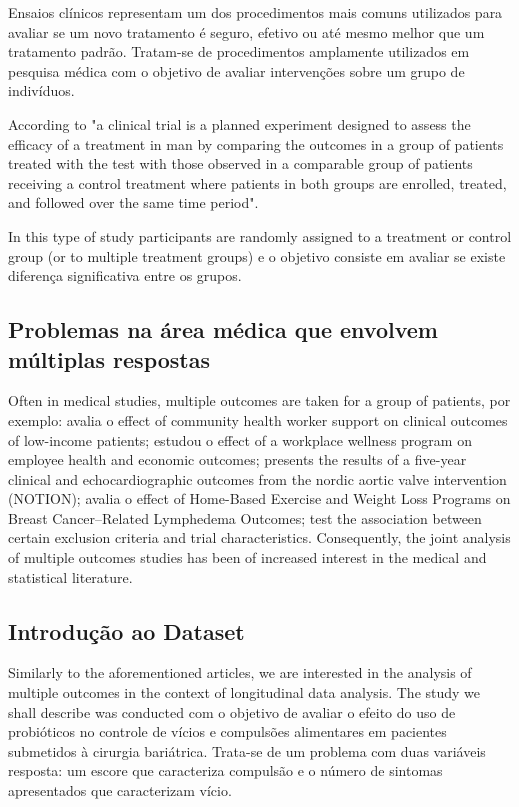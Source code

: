 \documentclass[AMA,STIX1COL]{WileyNJD-v2}
\begin{document}
Ensaios clínicos representam um dos procedimentos mais comuns utilizados para avaliar se um novo tratamento é seguro, efetivo ou até mesmo melhor que um tratamento padrão. Tratam-se de procedimentos amplamente utilizados em pesquisa médica com o objetivo de avaliar intervenções sobre um grupo de indivíduos.

According to \cite{meinert1986clinical} "a clinical trial is a planned experiment designed to assess the efficacy of a treatment in man by comparing the outcomes in a group of patients treated with the test with those observed in a comparable group of patients receiving a control treatment where patients in both groups are enrolled, treated, and followed over the same time period".

In this type of study participants are randomly assigned to a treatment or control group (or to multiple treatment groups) \cite{hannan2008randomized} e o objetivo consiste em avaliar se existe diferença significativa entre os grupos.

\subsection{Problemas na área médica que envolvem múltiplas respostas}

Often in medical studies, multiple outcomes are taken for a group of patients, por exemplo: \cite{kangovi2018effect} avalia o effect of community health worker support on clinical outcomes of low-income patients; \cite{song2019effect} estudou o effect of a workplace wellness program on employee health and economic outcomes; \cite{thyregod2019five} presents the results of a five-year clinical and echocardiographic outcomes from the nordic aortic valve intervention (NOTION); \cite{schmitz2019effect} avalia o effect of Home-Based Exercise and Weight Loss Programs on Breast Cancer–Related Lymphedema Outcomes; \cite{duma2019characterization} test the association between certain exclusion criteria and trial characteristics. Consequently, the joint analysis of multiple outcomes studies has been of increased interest in the medical and statistical literature. 

\subsection{Introdução ao Dataset}

Similarly to the aforementioned articles, we are interested in the analysis of multiple outcomes in the context of longitudinal data analysis. The study we shall describe was conducted com o objetivo de avaliar o efeito do uso de probióticos no controle de vícios e compulsões alimentares em pacientes submetidos à cirurgia bariátrica. Trata-se de um problema com duas variáveis resposta: um escore que caracteriza compulsão e o número de sintomas apresentados que caracterizam vício. 
\end{document}
